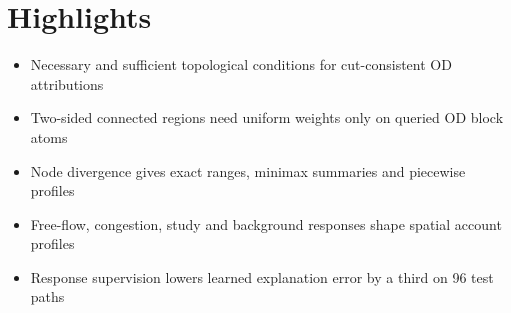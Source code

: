 \documentclass{article}
\begin{document}
\section*{Highlights}
\begin{itemize}
\item Necessary and sufficient topological conditions for cut-consistent OD attributions
\item Two-sided connected regions need uniform weights only on queried OD block atoms
\item Node divergence gives exact ranges, minimax summaries and piecewise profiles
\item Free-flow, congestion, study and background responses shape spatial account profiles
\item Response supervision lowers learned explanation error by a third on 96 test paths
\end{itemize}
\end{document}
